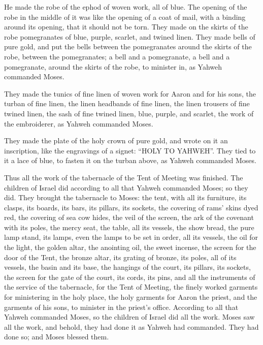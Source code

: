  He made the robe of the ephod of woven work, all of
blue.  The opening of the robe in the middle of it was
like the opening of a coat of mail, with a binding around its opening,
that it should not be torn.  They made on the skirts of
the robe pomegranates of blue, purple, scarlet, and twined linen.
 They made bells of pure gold, and put the bells between
the pomegranates around the skirts of the robe, between the
pomegranates;  a bell and a pomegranate, a bell and a
pomegranate, around the skirts of the robe, to minister in, as Yahweh
commanded Moses.

 They made the tunics of fine linen of woven work for
Aaron and for his sons,  the turban of fine linen, the
linen headbands of fine linen, the linen trousers of fine twined linen,
 the sash of fine twined linen, blue, purple, and
scarlet, the work of the embroiderer, as Yahweh commanded Moses.

 They made the plate of the holy crown of pure gold, and
wrote on it an inscription, like the engravings of a signet: ``HOLY TO
YAHWEH''.  They tied to it a lace of blue, to fasten it
on the turban above, as Yahweh commanded Moses.

 Thus all the work of the tabernacle of the Tent of
Meeting was finished. The children of Israel did according to all that
Yahweh commanded Moses; so they did.  They brought the
tabernacle to Moses: the tent, with all its furniture, its clasps, its
boards, its bars, its pillars, its sockets,  the covering
of rams' skins dyed red, the covering of sea cow hides, the veil of the
screen,  the ark of the covenant with its poles, the
mercy seat,  the table, all its vessels, the show bread,
 the pure lamp stand, its lamps, even the lamps to be set
in order, all its vessels, the oil for the light,  the
golden altar, the anointing oil, the sweet incense, the screen for the
door of the Tent,  the bronze altar, its grating of
bronze, its poles, all of its vessels, the basin and its base,
 the hangings of the court, its pillars, its sockets, the
screen for the gate of the court, its cords, its pins, and all the
instruments of the service of the tabernacle, for the Tent of Meeting,
 the finely worked garments for ministering in the holy
place, the holy garments for Aaron the priest, and the garments of his
sons, to minister in the priest's office.  According to
all that Yahweh commanded Moses, so the children of Israel did all the
work.  Moses saw all the work, and behold, they had done
it as Yahweh had commanded. They had done so; and Moses blessed them.

